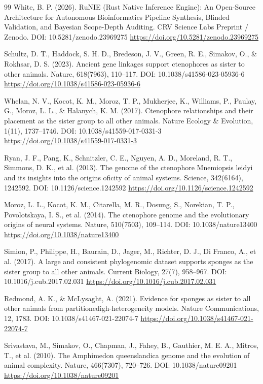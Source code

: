 \documentclass[10pt,letterpaper]{article}
\begin{document}
\begin{thebibliography}{99}
 White, B. P. (2026). RuNIE (Rust Native Inference Engine): An Open-Source Architecture for Autonomous Bioinformatics Pipeline Synthesis, Blinded Validation, and Bayesian Scope-Depth Auditing. CRV Science Labs Preprint / Zenodo. DOI: 10.5281/zenodo.23969275 \url{https://doi.org/10.5281/zenodo.23969275}

 Schultz, D. T., Haddock, S. H. D., Bredeson, J. V., Green, R. E., Simakov, O., \& Rokhsar, D. S. (2023). Ancient gene linkages support ctenophores as sister to other animals. Nature, 618(7963), 110--117. DOI: 10.1038/s41586-023-05936-6 \url{https://doi.org/10.1038/s41586-023-05936-6}

 Whelan, N. V., Kocot, K. M., Moroz, T. P., Mukherjee, K., Williams, P., Paulay, G., Moroz, L. L., \& Halanych, K. M. (2017). Ctenophore relationships and their placement as the sister group to all other animals. Nature Ecology \& Evolution, 1(11), 1737--1746. DOI: 10.1038/s41559-017-0331-3 \url{https://doi.org/10.1038/s41559-017-0331-3}

 Ryan, J. F., Pang, K., Schnitzler, C. E., Nguyen, A. D., Moreland, R. T., Simmons, D. K., et al. (2013). The genome of the ctenophore Mnemiopsis leidyi and its insights into the origins oficity of animal systems. Science, 342(6164), 1242592. DOI: 10.1126/science.1242592 \url{https://doi.org/10.1126/science.1242592}

 Moroz, L. L., Kocot, K. M., Citarella, M. R., Dosung, S., Norekian, T. P., Povolotskaya, I. S., et al. (2014). The ctenophore genome and the evolutionary origins of neural systems. Nature, 510(7503), 109--114. DOI: 10.1038/nature13400 \url{https://doi.org/10.1038/nature13400}

 Simion, P., Philippe, H., Baurain, D., Jager, M., Richter, D. J., Di Franco, A., et al. (2017). A large and consistent phylogenomic dataset supports sponges as the sister group to all other animals. Current Biology, 27(7), 958--967. DOI: 10.1016/j.cub.2017.02.031 \url{https://doi.org/10.1016/j.cub.2017.02.031}

 Redmond, A. K., \& McLysaght, A. (2021). Evidence for sponges as sister to all other animals from partitionedigh-heterogeneity models. Nature Communications, 12, 1783. DOI: 10.1038/s41467-021-22074-7 \url{https://doi.org/10.1038/s41467-021-22074-7}

 Srivastava, M., Simakov, O., Chapman, J., Fahey, B., Gauthier, M. E. A., Mitros, T., et al. (2010). The Amphimedon queenslandica genome and the evolution of animal complexity. Nature, 466(7307), 720--726. DOI: 10.1038/nature09201 \url{https://doi.org/10.1038/nature09201}


\end{thebibliography}
\end{document}
